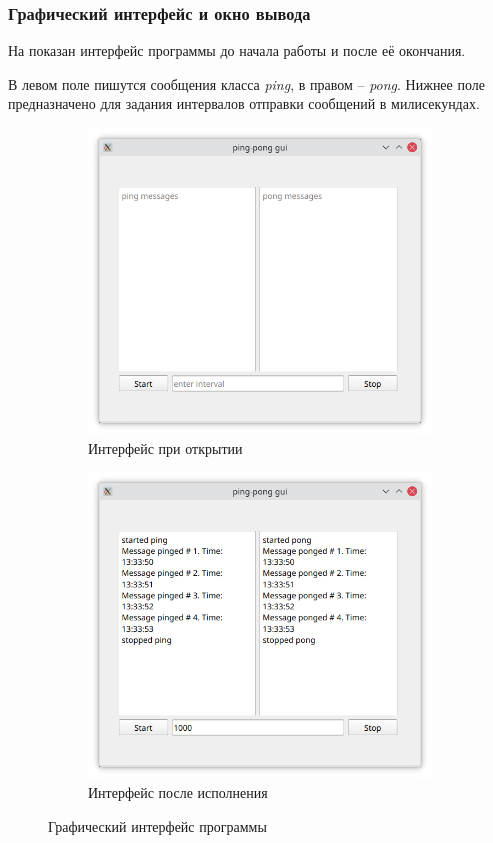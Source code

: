 \documentclass[../AISTR.tex]{subfiles}
\begin{document}
\subsubsection{Графический интерфейс и окно вывода}
На  показан интерфейс программы до начала работы и после её окончания.

В левом поле пишутся сообщения класса \textit{ping}, в правом -- \textit{pong}. Нижнее поле предназначено для задания интервалов отправки сообщений в милисекундах.

\begin{figure}[p]
	\begin{subfigure}{0.5\linewidth}
		\centering
		\includegraphics[width=0.9\linewidth]{../images/pp-start}
		\caption{Интерфейс при открытии}
		\label{fig:pp-start}
	\end{subfigure}
	\begin{subfigure}{0.5\linewidth}
		\centering
		\includegraphics[width=0.9\linewidth]{../images/pp-stop}
		\caption{Интерфейс после исполнения}
		\label{fig:pp-stop}
	\end{subfigure}
	\caption{Графический интерфейс программы}
	\label{fig:pp}
\end{figure}
\end{document}
